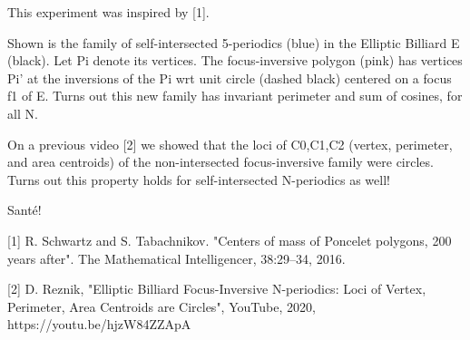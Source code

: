 This experiment was inspired by [1].

Shown is the family of self-intersected 5-periodics (blue) in the Elliptic Billiard E (black). Let Pi denote its vertices. The focus-inversive polygon (pink) has vertices Pi' at the inversions of the Pi wrt unit circle (dashed black) centered on a focus f1 of E. Turns out this new family has invariant perimeter and sum of cosines, for all N.

On a previous video [2] we showed that the loci of C0,C1,C2 (vertex, perimeter, and area centroids) of the non-intersected focus-inversive family were circles. Turns out this property holds for self-intersected N-periodics as well!

Santé!

[1] R. Schwartz and S. Tabachnikov. "Centers of mass of Poncelet polygons, 200 years after". The Mathematical Intelligencer, 38:29–34, 2016.

[2] D. Reznik, "Elliptic Billiard Focus-Inversive N-periodics: Loci of Vertex, Perimeter, Area Centroids are Circles", YouTube, 2020, https://youtu.be/hjzW84ZZApA